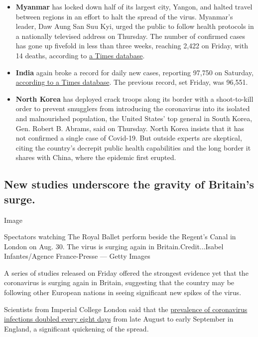 \begin{itemize}
\item
  \textbf{Myanmar} has locked down half of its largest city, Yangon, and
  halted travel between regions in an effort to halt the spread of the
  virus. Myanmar's leader, Daw Aung San Suu Kyi, urged the public to
  follow health protocols in a nationally televised address on Thursday.
  The number of confirmed cases has gone up fivefold in less than three
  weeks, reaching 2,422 on Friday, with 14 deaths, according to
  \href{https://www.nytimes3xbfgragh.onion/interactive/2020/world/coronavirus-maps.html}{a
  Times database}.
\item
  \textbf{India} again broke a record for daily new cases, reporting
  97,750 on Saturday,
  \href{https://www.nytimes3xbfgragh.onion/interactive/2020/world/asia/india-coronavirus-cases.html}{according
  to a Times database}. The previous record, set Friday, was 96,551.
\item
  \textbf{North Korea} has deployed crack troops along its border with a
  shoot-to-kill order to prevent smugglers from introducing the
  coronavirus into its isolated and malnourished population, the United
  States' top general in South Korea, Gen. Robert B. Abrams, said on
  Thursday. North Korea insists that it has not confirmed a single case
  of Covid-19. But outside experts are skeptical, citing the country's
  decrepit public health capabilities and the long border it shares with
  China, where the epidemic first erupted.
\end{itemize}

\hypertarget{new-studies-underscore-the-gravity-of-britains-surge}{%
\subsection{New studies underscore the gravity of Britain's
surge.}\label{new-studies-underscore-the-gravity-of-britains-surge}}

Image

Spectators watching The Royal Ballet perform beside the Regent's Canal
in London on Aug. 30. The virus is surging again in
Britain.Credit...Isabel Infantes/Agence France-Presse --- Getty Images

A series of studies released on Friday offered the strongest evidence
yet that the coronavirus is surging again in Britain, suggesting that
the country may be following other European nations in seeing
significant new spikes of the virus.

Scientists from Imperial College London said that the
\href{https://www.imperial.ac.uk/media/imperial-college/institute-of-global-health-innovation/public/Resurgence-of-SARS-CoV-2-in-England--detection-by-community-antigen-surveillance.pdf}{prevalence
of coronavirus infections doubled every eight days} from late August to
early September in England, a significant quickening of the spread.

